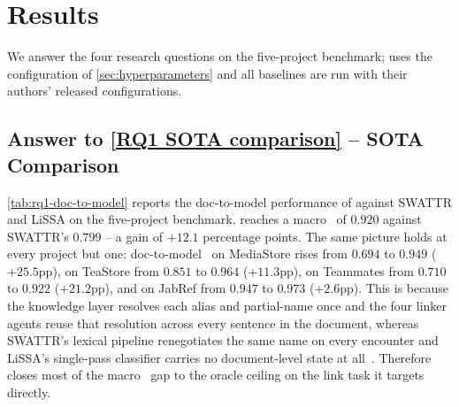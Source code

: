
\section{Results}
\label{sec:results}

We answer the four research questions on the five-project benchmark; \approach{} uses the configuration of \autoref{sec:hyperparameters} and all baselines are run with their authors' released configurations.

\subsection{Answer to \ref{RQ1 SOTA comparison} -- SOTA Comparison}
\label{sec:results:rq1}

\autoref{tab:rq1-doc-to-model} reports the doc-to-model performance of \approach{} against SWATTR and LiSSA on the five-project benchmark.
\approach{} reaches a macro \fone\ of $0.920$ against SWATTR's $0.799$ -- a gain of $+12.1$ percentage points.
The same picture holds at every project but one: doc-to-model \fone\ on MediaStore rises from $0.694$ to $0.949$ ($+25.5$pp), on TeaStore from $0.851$ to $0.964$ ($+11.3$pp), on Teammates from $0.710$ to $0.922$ ($+21.2$pp), and on JabRef from $0.947$ to $0.973$ ($+2.6$pp).
This is because the knowledge layer resolves each alias and partial-name once and the four linker agents reuse that resolution across every sentence in the document, whereas SWATTR's lexical pipeline renegotiates the same name on every encounter and LiSSA's single-pass classifier carries no document-level state at all~.
Therefore \approach{} closes most of the macro \fone\ gap to the oracle ceiling on the link task it targets directly.

